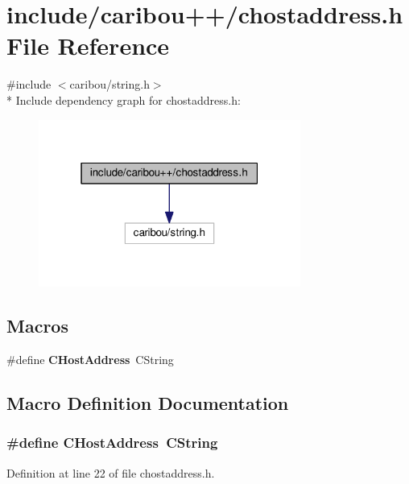 \section{include/caribou++/chostaddress.h File Reference}
\label{chostaddress_8h}
{\ttfamily \#include $<$caribou/string.\-h$>$}\\*
Include dependency graph for chostaddress.\-h\-:\nopagebreak
\begin{figure}[H]
\begin{center}
\leavevmode
\includegraphics[width=244pt]{chostaddress_8h__incl}
\end{center}
\end{figure}
\subsection*{Macros}
\begin{DoxyCompactItemize}
\item 
\#define {\bf C\-Host\-Address}~C\-String
\end{DoxyCompactItemize}


\subsection{Macro Definition Documentation}
\subsubsection[{C\-Host\-Address}]{\setlength{\rightskip}{0pt plus 5cm}\#define C\-Host\-Address~C\-String}\label{chostaddress_8h_a6625b164e26a513f67e667d330884baf}


Definition at line 22 of file chostaddress.\-h.

